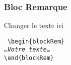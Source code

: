 \documentclass[aspectratio=169]{beamer}
\begin{document}
\begin{frame}
\frametitle{Bloc \og Remarque\fg}
\begin{blockRem}
Changer le texte ici
\end{blockRem}
\noindent\texttt{%
\textbackslash begin\{blockRem\}\\
\ldots\emph{Votre texte}\ldots\\
\textbackslash end\{blockRem\}}%
\end{frame}
\end{document}
